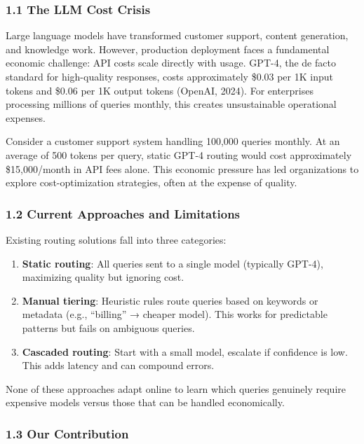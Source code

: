 \documentclass[
  11pt,
]{article}
\providecommand{\tightlist}{%
  \setlength{\itemsep}{0pt}\setlength{\parskip}{0pt}}
\begin{document}
\hypertarget{the-llm-cost-crisis}{%
\subsubsection{1.1 The LLM Cost Crisis}\label{the-llm-cost-crisis}}

Large language models have transformed customer support, content
generation, and knowledge work. However, production deployment faces a
fundamental economic challenge: API costs scale directly with usage.
GPT-4, the de facto standard for high-quality responses, costs
approximately \$0.03 per 1K input tokens and \$0.06 per 1K output tokens
(OpenAI, 2024). For enterprises processing millions of queries monthly,
this creates unsustainable operational expenses.

Consider a customer support system handling 100,000 queries monthly. At
an average of 500 tokens per query, static GPT-4 routing would cost
approximately \$15,000/month in API fees alone. This economic pressure
has led organizations to explore cost-optimization strategies, often at
the expense of quality.

\hypertarget{current-approaches-and-limitations}{%
\subsubsection{1.2 Current Approaches and
Limitations}\label{current-approaches-and-limitations}}

Existing routing solutions fall into three categories:

\begin{enumerate}
\def\labelenumi{\arabic{enumi}.}
\tightlist
\item
  \textbf{Static routing}: All queries sent to a single model (typically
  GPT-4), maximizing quality but ignoring cost.
\item
  \textbf{Manual tiering}: Heuristic rules route queries based on
  keywords or metadata (e.g., ``billing'' → cheaper model). This works
  for predictable patterns but fails on ambiguous queries.
\item
  \textbf{Cascaded routing}: Start with a small model, escalate if
  confidence is low. This adds latency and can compound errors.
\end{enumerate}

None of these approaches adapt online to learn which queries genuinely
require expensive models versus those that can be handled economically.

\hypertarget{our-contribution}{%
\subsubsection{1.3 Our Contribution}\label{our-contribution}}
\end{document}
